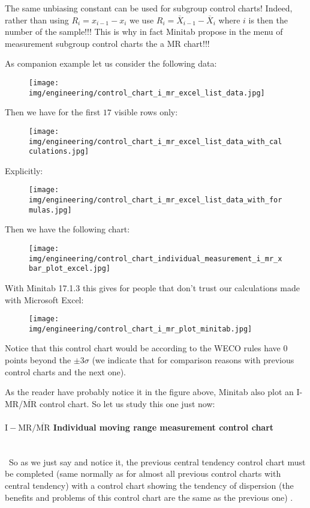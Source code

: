 	\begin{tcolorbox}[title=Remark,colframe=black,arc=10pt]
	The same unbiasing constant can be used for subgroup control charts! Indeed, rather than using $R_i=x_{i-1}-x_i$ we use $R_i=\overline{X}_{i-1}-\overline{X}_i$ where $i$ is then the number of the sample!!! This is why in fact Minitab propose in the menu of measurement subgroup control charts the a MR chart!!!
	\end{tcolorbox}
	As companion example let us consider the following data:
	\begin{figure}[H]
		\centering
		\texttt{[image: img/engineering/control\_chart\_i\_mr\_excel\_list\_data.jpg]}
	\end{figure}
	Then we have for the first $17$ visible rows only:
	\begin{figure}[H]
		\centering
		\texttt{[image: img/engineering/control\_chart\_i\_mr\_excel\_list\_data\_with\_calculations.jpg]}
	\end{figure}
	Explicitly:
	\begin{figure}[H]
		\centering
		\texttt{[image: img/engineering/control\_chart\_i\_mr\_excel\_list\_data\_with\_formulas.jpg]}
	\end{figure}
	Then we have the following chart:
	\begin{figure}[H]
		\centering
		\texttt{[image: img/engineering/control\_chart\_individual\_measurement\_i\_mr\_xbar\_plot\_excel.jpg]}
	\end{figure}
	With Minitab 17.1.3 this gives for people that don't trust our calculations made with Microsoft Excel:
	\begin{figure}[H]
		\centering
		\texttt{[image: img/engineering/control\_chart\_i\_mr\_plot\_minitab.jpg]}
	\end{figure}
	Notice that this control chart would be according to the WECO rules have $0$ points beyond the $\pm 3\sigma$ (we indicate that for comparison reasons with previous control charts and the next one).
	
	As the reader have probably notice it in the figure above, Minitab also plot an I-MR/$\overline{\text{MR}}$ control chart. So let us study this one just now:
	
	\paragraph{$\text{I}-\text{MR}/\overline{\text{MR}}$ Individual moving range measurement control chart}\mbox{}\\\
	So as we just say and notice it, the previous central tendency control chart must be completed (same normally as for almost all previous control charts with central tendency) with a control chart showing the tendency of dispersion (the benefits and problems of this control chart are the same as the previous one) .

